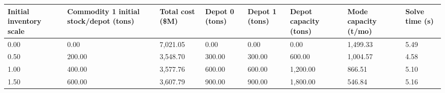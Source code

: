 \begin{tabular}{llllllll}
\toprule
Initial inventory scale & Commodity 1 initial stock/depot (tons) & Total cost (\$M) & Depot 0 (tons) & Depot 1 (tons) & Depot capacity (tons) & Mode capacity (t/mo) & Solve time (s) \\
\midrule
0.00 & 0.00 & 7,021.05 & 0.00 & 0.00 & 0.00 & 1,499.33 & 5.49 \\
0.50 & 200.00 & 3,548.70 & 300.00 & 300.00 & 600.00 & 1,004.57 & 4.58 \\
1.00 & 400.00 & 3,577.76 & 600.00 & 600.00 & 1,200.00 & 866.51 & 5.10 \\
1.50 & 600.00 & 3,607.79 & 900.00 & 900.00 & 1,800.00 & 546.84 & 5.16 \\
\bottomrule
\end{tabular}
